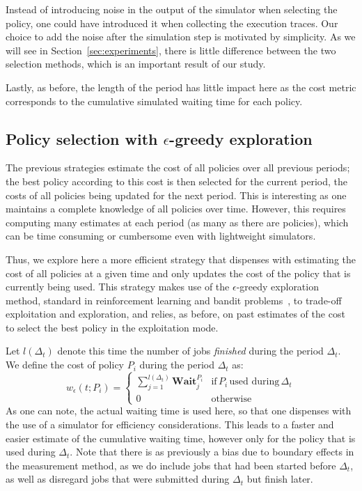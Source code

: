 \documentclass[sigconf,anonymous]{acmart}
\begin{document}
Instead of introducing noise in the output of the simulator when selecting the
policy, one could have introduced it when collecting the execution traces. Our choice
to add the noise after the simulation step is motivated by simplicity. As we
will see in Section~\ref{sec:experiments}, there is little difference between
the two selection methods, which is an important result of our study.

Lastly, as before, the length of the period has little impact here as the cost
metric corresponds to the cumulative simulated waiting time for each policy.

\subsection{Policy selection with $\epsilon$-greedy exploration}
\label{sub:bandit}

The previous strategies estimate the cost of all policies over all previous
periods; the best policy according to this cost is then selected for the
current period, the costs of all policies being updated for the next period.
This is interesting as one maintains a complete knowledge of all policies over
time. However, this requires computing many estimates at each period (as many
as there are policies), which can be time consuming or cumbersome even with
lightweight simulators.

Thus, we explore here a more efficient strategy that dispenses with estimating
the cost of all policies at a given time and only updates the cost of the
policy that is currently being used. This strategy makes use of the
$\epsilon$-greedy exploration method, standard in reinforcement learning
\cite{Watkins:1989} and bandit problems~\cite{Auer2002}, to trade-off
exploitation and exploration, and relies, as before, on past estimates of the
cost to select the best policy in the exploitation mode.

Let $l(\Delta_t)$ denote this time the number of jobs \textit{finished} during
the period $\Delta_t$. We define the cost of policy $P_i$ during the period
$\Delta_t$ as:
%
\[ w_{\epsilon}(t;P_i) = \left\{ \begin{array}{ll} \sum_{j=1}^{l(\Delta_t)}
  \textbf{Wait}_j^{P_i} & \mbox{if} \, P_i \, \mbox{used during} \, \Delta_t
  \nonumber\\ 0 & \mbox{otherwise} \end{array} \right.  \]
%
As one can note, the actual waiting time is used here, so that one dispenses
with the use of a simulator for efficiency considerations. This leads to a
faster and easier estimate of the cumulative waiting time, however only for the
policy that is used during $\Delta_t$. Note that there is as previously a bias
due to boundary effects in the measurement method, as we do include jobs that
had been started before $\Delta_t$, as well as disregard jobs that were
submitted during $\Delta_t$ but finish later.
\end{document}
